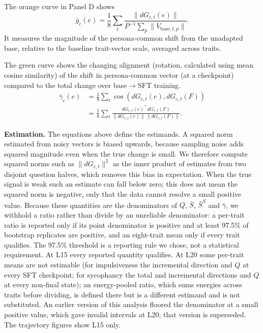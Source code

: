 \documentclass{article}
\begin{document}
The orange curve in Panel D shows
\begin{equation}
\bar g_c(e)
 = \frac18\sum_t
   \frac{\|dG_{c,t}(e)\|}
        {P^{-1}\sum_p\|V_{\mathrm{base},t,p}\|}.
\end{equation}
It measures the magnitude of the persona-common shift
from the unadapted base, relative to the baseline
trait-vector scale, averaged across traits.

The green curve shows the changing alignment (rotation, calculated using mean cosine similarity) of the shift in persona-common vector (at a checkpoint) compared to the total change over base$\rightarrow$SFT training.
\begin{align}
\bar\gamma_c(e)
 &= \frac18\sum_t
    \cos\!\left(dG_{c,t}(e),dG_{c,t}(F)\right) \\
 &= \frac18\sum_t
    \frac{dG_{c,t}(e)^\top dG_{c,t}(F)}
         {\|dG_{c,t}(e)\|\,\|dG_{c,t}(F)\|}.
\end{align}

\noindent\textbf{Estimation.} The equations above define the estimands. A squared norm estimated from noisy vectors is biased upwards, because sampling noise adds squared magnitude even when the true change is small. We therefore compute squared norms such as $\|dG_{c,t}\|^2$ as the inner product of estimates from two disjoint question halves, which removes this bias in expectation. When the true signal is weak such an estimate can fall below zero; this does not mean the squared norm is negative, only that the data cannot resolve a small positive value. Because these quantities are the denominators of $Q$, $\bar S$, $\bar S^S$ and $\bar\gamma$, we withhold a ratio rather than divide by an unreliable denominator: a per-trait ratio is reported only if its point denominator is positive and at least 97.5\% of bootstrap replicates are positive, and an eight-trait mean only if every trait qualifies. The 97.5\% threshold is a reporting rule we chose, not a statistical requirement. At L15 every reported quantity qualifies. At L20 some per-trait means are not estimable (for impulsiveness the incremental direction and $Q$ at every SFT checkpoint; for sycophancy the total and incremental directions and $Q$ at every non-final state); an energy-pooled ratio, which sums energies across traits before dividing, is defined there but is a different estimand and is not substituted. An earlier version of this analysis floored the denominator at a small positive value, which gave invalid intervals at L20; that version is superseded. The trajectory figures show L15 only.
\end{document}
